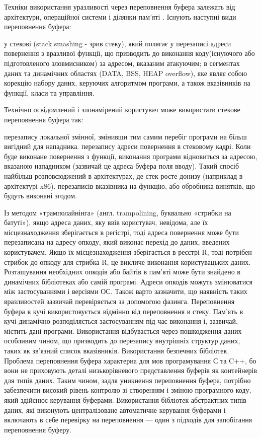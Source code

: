 
Техніки використання уразливості через переповнення буфера залежать від архітектури, операційної системи і ділянки пам'яті 
.
Існують наступні види переповнення буфера:
\begin{itemize}
 у стекові (stack smashing - зрив стеку), який полягає у перезаписі адреси повернення з вразливої функції, що призводить до виконання коду(існуючого або підготовленого зловмисником) за адресом, вказаним атакуючим;
 в сегментах даних та динамічних областях (DATA, BSS, HEAP overflow), яке являє собою корекцію набору даних, керуючих алгоритмом програми, а також вказівників на функції, класи та управління. 
\end{itemize}


Технічно освідомлений і злонамірений користувач може використати стекове переповнення буфера так:
\begin{enumerate}
 перезапису локальної змінної, змінивши тим самим перебіг програми на більш вигідний для нападника.
 перезапису адреси повернення в стековому кадрі. Коли буде виконане повернення з функції, виконання програми відновиться за адресою, вказаною нападником (зазвичай це адреса буфера поля вводу). Такий спосіб найбільш розповсюджений в архітектурах, де стек росте донизу (наприклад в архітектурі x86).
 перезаписів вказівника на функцію, або обробника винятків, що будуть виконані згодом. 
\end{enumerate}


Із методом «трамполайнінга» (англ. trampolining, буквально «стрибки на батуті»), якщо адреса даних, яку ввів користувач, невідома, але їх місцезнаходження зберігається в регістрі, тоді адреса повернення може бути перезаписана на адресу опкоду, який виконає перехід до даних, введених користувачем. Якщо їх місцезнаходження зберігається в реєстрі R, тоді потрібен стрибок до опкоду для стрибка R, це викличе виконання користувацьких даних. Розташування необхідних опкодів або байтів в пам'яті може бути знайдено в динамічних бібліотеках або самій програмі. Адреси опкодів можуть змінюватися між застосуваннями і версіями ОС.
Також варто зазначити, що наявність таких вразливостей зазвичай перевіряється за допомогою фазинга.
Переповнення буфера в кучі використовується відмінно від переповнення в стеку. Пам'ять в кучі динамічно розподіляється застосуванням під час виконання і, зазвичай, містить дані програми. Використання відбувається через пошкодження даних особливим чином, що призводить до перезапису внутрішніх структур даних, таких як зв'язний список вказівників.
Використання безпечних бібліотек. Проблема переповнення буфера характерна для мов програмування С та C++, бо вони не приховують деталі низькорівневого представлення буферів як контейнерів для типів даних. Таким чином, задля уникнення переповнення буфера, потрібно забезпечити високий рівень контролю зі створенням і зміною програмного коду, який здійснює керування буферами. Використання бібліотек абстрактних типів даних, які виконують централізоване автоматичне керування буферами і включають в себе перевірку на переповнення — один з підходів для запобігання переповнення буферу.

